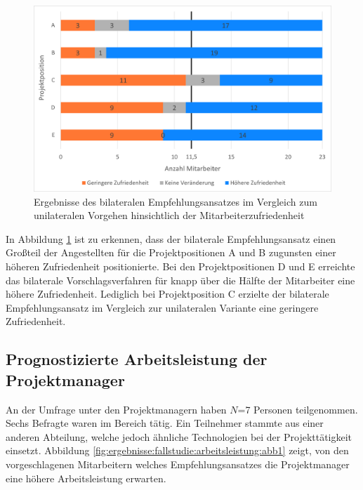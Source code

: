 \begin{figure}[h]
	\centering
	\includegraphics[width=1\textwidth]{gfx/zufriedenheit-projekte.png}	
	\caption{Ergebnisse des bilateralen Empfehlungsansatzes im Vergleich zum unilateralen Vorgehen hinsichtlich der Mitarbeiterzufriedenheit}
	\label{fig:ergebnisse:analyse:abb7}
\end{figure}
In Abbildung \ref{fig:ergebnisse:analyse:abb7} ist zu erkennen, dass der bilaterale Empfehlungsansatz einen Großteil der Angestellten für die Projektpositionen A und B zugunsten einer höheren Zufriedenheit positionierte. Bei den Projektpositionen D und E erreichte das bilaterale Vorschlagsverfahren für knapp über die Hälfte der Mitarbeiter eine höhere Zufriedenheit. Lediglich bei Projektposition C erzielte der bilaterale Empfehlungsansatz im Vergleich zur unilateralen Variante eine geringere Zufriedenheit.
\newpage
\subsection{Prognostizierte Arbeitsleistung der Projektmanager}
\label{ch:ergebnisse:fallstudie:arbeitsleistung}
An der Umfrage unter den Projektmanagern haben $N$=7 Personen teilgenommen. Sechs Befragte waren im Bereich \JES tätig. Ein Teilnehmer stammte aus einer anderen Abteilung, welche jedoch ähnliche Technologien bei der Projekttätigkeit einsetzt. Abbildung \ref{fig:ergebnisse:fallstudie:arbeitsleistung:abb1} zeigt, von den vorgeschlagenen Mitarbeitern welches Empfehlungsansatzes die Projektmanager eine höhere Arbeitsleistung erwarten.

